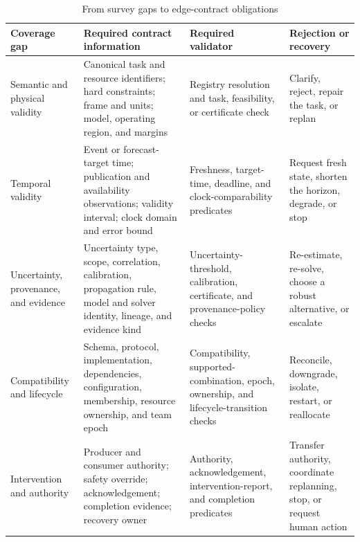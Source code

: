 \begin{table}[!ht]
  \centering
  \caption{From survey gaps to edge-contract obligations}
  \label{tab:coverage-obligations}
  \scriptsize
  \setlength{\tabcolsep}{3pt}
  \begin{tabularx}{\textwidth}{@{}P{0.16\textwidth}P{0.32\textwidth}P{0.24\textwidth}Y@{}}
    \toprule
    Coverage gap & Required contract information & Required validator & Rejection or recovery \\
    \midrule
    Semantic and physical validity & Canonical task and resource identifiers; hard constraints; frame and units; model, operating region, and margins & Registry resolution and task, feasibility, or certificate check & Clarify, reject, repair the task, or replan \\
    Temporal validity & Event or forecast-target time; publication and availability observations; validity interval; clock domain and error bound & Freshness, target-time, deadline, and clock-comparability predicates & Request fresh state, shorten the horizon, degrade, or stop \\
    Uncertainty, provenance, and evidence & Uncertainty type, scope, correlation, calibration, propagation rule, model and solver identity, lineage, and evidence kind & Uncertainty-threshold, calibration, certificate, and provenance-policy checks & Re-estimate, re-solve, choose a robust alternative, or escalate \\
    Compatibility and lifecycle & Schema, protocol, implementation, dependencies, configuration, membership, resource ownership, and team epoch & Compatibility, supported-combination, epoch, ownership, and lifecycle-transition checks & Reconcile, downgrade, isolate, restart, or reallocate \\
    Intervention and authority & Producer and consumer authority; safety override; acknowledgement; completion evidence; recovery owner & Authority, acknowledgement, intervention-report, and completion predicates & Transfer authority, coordinate replanning, stop, or request human action \\
    \bottomrule
  \end{tabularx}
\end{table}
